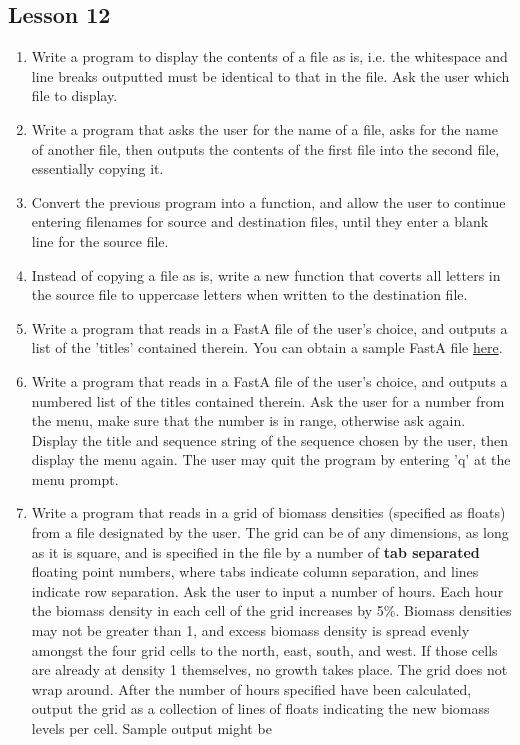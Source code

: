 \subsection{Lesson 12}
\begin{enumerate}
	\item Write a program to display the contents of a file as is, i.e.    the whitespace and line breaks outputted must be identical to that    in the file. Ask the user which file to display.
	\item Write a program that asks the user for the name of a file, asks    for the name of another file, then outputs the contents of the    first file into the second file, essentially copying it.
	\item Convert the previous program into a function, and allow the    user to continue entering filenames for source and destination    files, until they enter a blank line for the source file.
	\item Instead of copying a file as is, write a new function that    coverts all letters in the source file to uppercase letters when    written to the destination file.
	\item Write a program that reads in a FastA file of the user's    choice, and outputs a list of the 'titles' contained therein. You    can obtain a sample FastA file \href{data/brca.fasta}{here}.
	\item Write a program that reads in a FastA file of the user's    choice, and outputs a numbered list of the titles contained    therein. Ask the user for a number from the menu, make sure that    the number is in range, otherwise ask again.  Display the title and    sequence string of the sequence chosen by the user, then display    the menu again. The user may quit the program by entering 'q' at    the menu prompt.
	\item Write a program that reads in a grid of biomass densities (specified as floats) from a file designated by the user. The grid can be of any dimensions, as long as it is square, and is specified in the file by a number of \textbf{     tab separated} floating point numbers, where tabs indicate column separation, and lines indicate row separation. Ask the user to input a number of hours. Each hour the biomass density in each cell of the grid increases by 5\%. Biomass     densities may not be greater than 1, and excess biomass density is spread evenly amongst the four grid cells to the north, east, south, and west. If those cells are already at density 1 themselves, no growth takes place. The grid does not wrap     around. After the number of hours specified have been calculated, output the grid as a collection of lines of floats indicating the new biomass levels per cell. Sample output might be     
\begin{lstlisting}


\end{lstlisting}
\end{enumerate}
